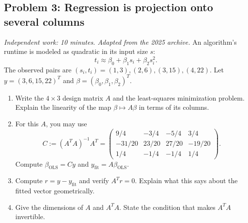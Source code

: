 \documentclass[11pt]{article}
\newcommand{\ols}{\mathrm{OLS}}
\newcommand{\workingspace}[1]{}
\newcommand{\workingspace}[1]{\vspace{#1}}
\begin{document}
\subsection*{Problem 3: Regression is projection onto several columns}
\noindent\textit{Independent work: 10 minutes. Adapted from the 2025 archive.}
An algorithm's runtime is modeled as quadratic in its input size $s$:
\[
 t_i\approx\beta_0+\beta_1s_i+\beta_2s_i^2.
\]
The observed pairs are $(s_i,t_i)=(1,3),(2,6),(3,15),(4,22)$.
Let $y=(3,6,15,22)^T$ and $\beta=(\beta_0,\beta_1,\beta_2)^T$.
\begin{enumerate}
 \item Write the $4\times3$ design matrix $A$ and the least-squares
 minimization problem. Explain the linearity of the map $\beta\mapsto A\beta$ in terms
 of its columns.
 \item For this $A$, you may use
 \[
 C:=(A^TA)^{-1}A^T=
 \begin{pmatrix}
 9/4&-3/4&-5/4&3/4\\
 -31/20&23/20&27/20&-19/20\\
 1/4&-1/4&-1/4&1/4
 \end{pmatrix}.
 \]
 Compute $\beta_{\ols}=Cy$ and $y_{\mathrm{fit}}=A\beta_{\ols}$.
 \item Compute $r=y-y_{\mathrm{fit}}$ and verify $A^Tr=0$.
 Explain what this says about the fitted vector geometrically.
 \item Give the dimensions of $A$ and $A^TA$.
 State the condition that makes $A^TA$ invertible.
\end{enumerate}
\workingspace{9cm}
\end{document}
